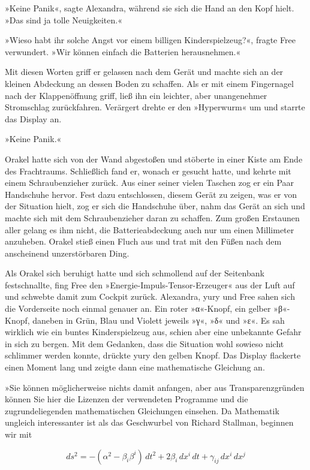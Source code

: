 »Keine Panik«, sagte Alexandra, während sie sich die Hand an den Kopf hielt. »Das sind ja tolle Neuigkeiten.«

»Wieso habt ihr solche Angst vor einem billigen Kinderspielzeug?«, fragte Free verwundert. »Wir können einfach die Batterien herausnehmen.«

Mit diesen Worten griff er gelassen nach dem Gerät und machte sich an der kleinen Abdeckung an dessen Boden zu schaffen. Als er mit einem Fingernagel nach der Klappenöffnung griff, ließ ihn ein leichter, aber unangenehmer Stromschlag zurückfahren. Verärgert drehte er den »Hyperwurm« um und starrte das Display an.

»Keine Panik.«

Orakel hatte sich von der Wand abgestoßen und stöberte in einer Kiste am Ende des Frachtraums. Schließlich fand er, wonach er gesucht hatte, und kehrte mit einem Schraubenzieher zurück. Aus einer seiner vielen Taschen zog er ein Paar Handschuhe hervor. Fest dazu entschlossen, diesem Gerät zu zeigen, was er von der Situation hielt, zog er sich die Handschuhe über, nahm das Gerät an sich und machte sich mit dem Schraubenzieher daran zu schaffen. Zum großen Erstaunen aller gelang es ihm nicht, die Batterieabdeckung auch nur um einen Millimeter anzuheben. Orakel stieß einen Fluch aus und trat mit den Füßen nach dem anscheinend unzerstörbaren Ding.

Als Orakel sich beruhigt hatte und sich schmollend auf der Seitenbank festschnallte, fing Free den »Energie-Impuls-Tensor-Erzeuger« aus der Luft auf und schwebte damit zum Cockpit zurück. Alexandra, yury und Free sahen sich die Vorderseite noch einmal genauer an. Ein roter »α«-Knopf, ein gelber »β«-Knopf, daneben in Grün, Blau und Violett jeweils »γ«, »δ« und »ε«. Es sah wirklich wie ein buntes Kinderspielzeug aus, schien aber eine unbekannte Gefahr in sich zu bergen. Mit dem Gedanken, dass die Situation wohl sowieso nicht schlimmer werden konnte, drückte yury den gelben Knopf. Das Display flackerte einen Moment lang und zeigte dann eine mathematische Gleichung an.

»Sie können möglicherweise nichts damit anfangen, aber aus Transparenzgründen können Sie hier die Lizenzen der verwendeten Programme und die zugrundeliegenden mathematischen Gleichungen einsehen. Da Mathematik ungleich interessanter ist als das Geschwurbel von Richard Stallman, beginnen wir mit

\begin{displaymath}
ds^2 = -(\alpha^2 - \beta_i \beta^i) \,dt^2 + 2 \beta_i \,dx^i \,dt + \gamma_{ij}\,dx^i\,dx^j
\end{displaymath}

